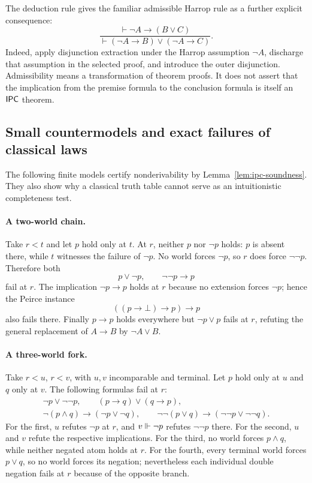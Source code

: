 The deduction rule gives the familiar admissible Harrop rule as a further
explicit consequence:
\[
\frac{\vdash\neg A\to(B\vee C)}
     {\vdash(\neg A\to B)\vee(\neg A\to C)}.
\]
Indeed, apply disjunction extraction under the Harrop assumption $\neg A$,
discharge that assumption in the selected proof, and introduce the outer
disjunction. Admissibility means a transformation of theorem proofs. It
does not assert that the implication from the premise formula to the
conclusion formula is itself an $\mathsf{IPC}$ theorem.

\subsection{Small countermodels and exact failures of classical laws}

The following finite models certify nonderivability by
Lemma~\ref{lem:ipc-soundness}. They also show why a classical truth table
cannot serve as an intuitionistic completeness test.

\paragraph{A two-world chain.}
Take $r<t$ and let $p$ hold only at $t$. At $r$, neither $p$ nor $\neg p$
holds: $p$ is absent there, while $t$ witnesses the failure of $\neg p$.
No world forces $\neg p$, so $r$ does force $\neg\neg p$. Therefore both
\[
              p\vee\neg p,
              \qquad \neg\neg p\to p
\]
fail at $r$. The implication $\neg p\to p$ holds at $r$ because no extension
forces $\neg p$; hence the Peirce instance
\[
                      ((p\to\bot)\to p)\to p
\]
also fails there. Finally $p\to p$ holds everywhere but $\neg p\vee p$
fails at $r$, refuting the general replacement of $A\to B$ by
$\neg A\vee B$.

\paragraph{A three-world fork.}
Take $r<u$, $r<v$, with $u,v$ incomparable and terminal. Let $p$ hold only
at $u$ and $q$ only at $v$. The following formulas fail at $r$:
\[
\begin{gathered}
\neg p\vee\neg\neg p,\qquad
(p\to q)\vee(q\to p),\\
\neg(p\wedge q)\to(\neg p\vee\neg q),\qquad
\neg\neg(p\vee q)\to(\neg\neg p\vee\neg\neg q).
\end{gathered}
\]
For the first, $u$ refutes $\neg p$ at $r$, and $v\Vdash\neg p$ refutes
$\neg\neg p$ there. For the second, $u$ and $v$ refute the respective
implications. For the third, no world forces $p\wedge q$, while neither
negated atom holds at $r$. For the fourth, every terminal world forces
$p\vee q$, so no world forces its negation; nevertheless each individual
double negation fails at $r$ because of the opposite branch.

